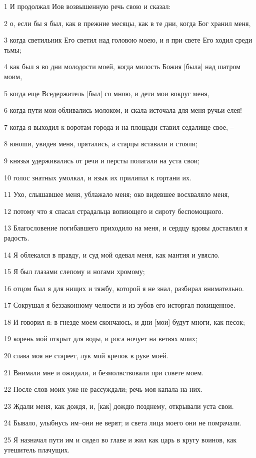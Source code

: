 \par 1 И продолжал Иов возвышенную речь свою и сказал:
\par 2 о, если бы я был, как в прежние месяцы, как в те дни, когда Бог хранил меня,
\par 3 когда светильник Его светил над головою моею, и я при свете Его ходил среди тьмы;
\par 4 как был я во дни молодости моей, когда милость Божия [была] над шатром моим,
\par 5 когда еще Вседержитель [был] со мною, и дети мои вокруг меня,
\par 6 когда пути мои обливались молоком, и скала источала для меня ручьи елея!
\par 7 когда я выходил к воротам города и на площади ставил седалище свое, --
\par 8 юноши, увидев меня, прятались, а старцы вставали и стояли;
\par 9 князья удерживались от речи и персты полагали на уста свои;
\par 10 голос знатных умолкал, и язык их прилипал к гортани их.
\par 11 Ухо, слышавшее меня, ублажало меня; око видевшее восхваляло меня,
\par 12 потому что я спасал страдальца вопиющего и сироту беспомощного.
\par 13 Благословение погибавшего приходило на меня, и сердцу вдовы доставлял я радость.
\par 14 Я облекался в правду, и суд мой одевал меня, как мантия и увясло.
\par 15 Я был глазами слепому и ногами хромому;
\par 16 отцом был я для нищих и тяжбу, которой я не знал, разбирал внимательно.
\par 17 Сокрушал я беззаконному челюсти и из зубов его исторгал похищенное.
\par 18 И говорил я: в гнезде моем скончаюсь, и дни [мои] будут многи, как песок;
\par 19 корень мой открыт для воды, и роса ночует на ветвях моих;
\par 20 слава моя не стареет, лук мой крепок в руке моей.
\par 21 Внимали мне и ожидали, и безмолвствовали при совете моем.
\par 22 После слов моих уже не рассуждали; речь моя капала на них.
\par 23 Ждали меня, как дождя, и, [как] дождю позднему, открывали уста свои.
\par 24 Бывало, улыбнусь им--они не верят; и света лица моего они не помрачали.
\par 25 Я назначал пути им и сидел во главе и жил как царь в кругу воинов, как утешитель плачущих.

